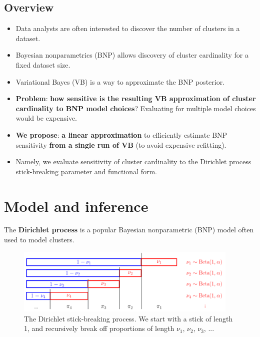 \documentclass[a0,plainsections,30pt]{sciposter}\usepackage[]{graphicx}\usepackage[]{color}
\begin{document}
\begin{minipage}[t]{0.45\textwidth}

\begin{mdframed}[style=MyFrame]
\section*{Overview}
\vspace{-0.3in}
\begin{itemize}

\item Data analysts are often interested to discover the number of
clusters in a dataset. 
\item Bayesian nonparametrics (BNP) allows discovery of cluster
cardinality for a fixed dataset size. 
\item Variational Bayes (VB) is a way to approximate the BNP posterior. 
\item \textbf{Problem}: \textbf{how sensitive is the resulting
VB approximation of cluster cardinality to BNP model choices}? Evaluating
for multiple model choices would be expensive. 
\item \textbf{We propose}: \textbf{a linear approximation} to efficiently
estimate BNP sensitivity \textbf{from a single run of VB} (to avoid
expensive refitting). 
\item Namely, we evaluate sensitivity of cluster cardinality to the Dirichlet process
stick-breaking parameter and functional form. 

\end{itemize}
\end{mdframed}
\vspace{-0.7in}

\section*{Model and inference }
\vspace{-0.3in}

The \textbf{Dirichlet process} is a popular Bayesian nonparametric
(BNP) model often used to model clusters. 

\begin{figure}[!h]
\centering
\includegraphics[width = 0.95\textwidth]{./images/DP_stick_breaking.png}
\caption{The Dirichlet stick-breaking process. We start with a stick of
length 1, and recursively break off proportions of length $\nu_1$, $\nu_2$, $\nu_3$, ...}
\setlength{\textfloatsep}{-10pt}
\end{figure}


\end{minipage}
\end{document}
